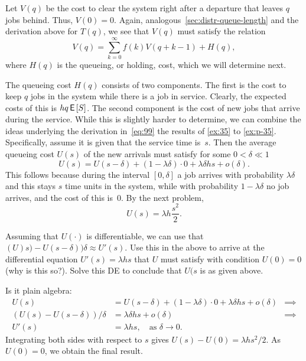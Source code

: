 Let $V(q)$ be the cost to clear the system right after a departure that leaves $q$ jobs behind.
Thus, $V(0)=0$.
Again, analogous~\cref{sec:distr-queue-length} and the derivation above for $T(q)$, we see that $V(q)$ must satisfy the relation
\begin{equation}
  \label{eq:98}
  V(q) = \sum_{k=0}^\infty f(k) V(q+k-1) + H(q), 
\end{equation}
where $H(q)$ is the queueing, or holding, cost, which we will determine next.

The queueing cost $H(q)$ consists of two components.
The first is the cost to keep $q$ jobs in the system while there is a job in service.
Clearly, the expected costs of this is $h q \,\mathsf{E}\left[S\right]$.
The second component is the cost of new jobs that arrive during the service.
While this is slightly harder to determine, we can combine the ideas underlying the derivation in~\cref{eq:99} the results of \cref{ex:35} to \cref{ex:p-35}.
Specifically, assume it is given that the service time is~$s$.
Then the average queueing cost $U(s)$ of the new arrivals must satisfy for some $0<\delta\ll 1$
\begin{equation*}
  U(s) = U(s-\delta) + (1-\lambda \delta)\cdot 0 + \lambda \delta h s + o(\delta).
\end{equation*}
This follows because during the interval $[0,\delta]$ a job arrives with probability $\lambda \delta$ and this stays $s$ time units in the system, while with probability $1-\lambda \delta$ no job arrives, and the cost of this is~$0$.
By the next problem, 
\begin{equation*}
  U(s) = \lambda h \frac{s^2}2. 
\end{equation*}

\begin{exercise}
Assuming that $U(\cdot)$ is differentiable, we can use that $(U)s) - U(s-\delta))\delta \approx U'(s)$.
Use this in the above to arrive at the differential equation $U'(s) = \lambda h s$ that $U$ must satisfy with condition $U(0)=0$ (why is this so?).
Solve this DE to conclude that $U(s$ is as given above. 
\begin{solution}
Is it plain algebra:
\begin{align*}
  U(s)&=  U(s-\delta) + (1-\lambda \delta)\cdot 0 + \lambda \delta h s + o(\delta) &\implies\\
  (U(s) -U(s-\delta))/\delta &= \lambda \delta h s + o(\delta) & \implies \\
  U'(s)&= \lambda h s, \quad\text{as } \delta \to 0.
\end{align*}
Integrating  both sides with respect to $s$ gives $U(s) - U(0) = \lambda h s^2/2$. As $U(0)=0$, we obtain the final result.
\end{solution}
\end{exercise}

